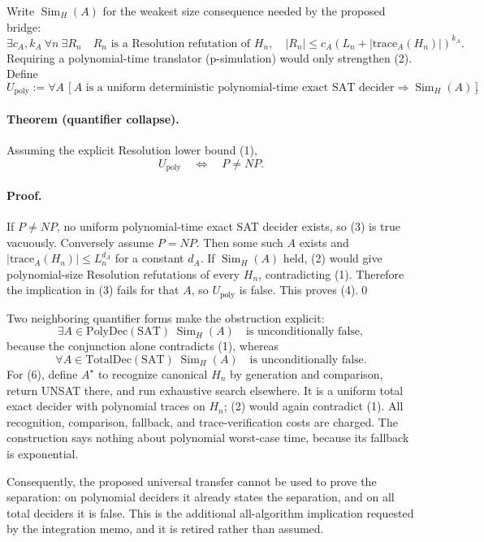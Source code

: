 \documentclass[11pt]{article}
\newcommand{\SAT}{\mathrm{SAT}}
\newcommand{\poly}{\mathrm{poly}}
\begin{document}
Write $\operatorname{Sim}_H(A)$ for the weakest size consequence needed by
the proposed bridge:
\[
 \exists c_A,k_A\ \forall n\ \exists R_n\quad
  R_n\text{ is a Resolution refutation of }H_n,
 \quad |R_n|\le c_A(L_n+|\mathrm{trace}_A(H_n)|)^{k_A}.       \tag{2}
\]
Requiring a polynomial-time translator (p-simulation) would only strengthen
(2).  Define
\[
 U_{\poly}:=\forall A\,[A\text{ is a uniform deterministic polynomial-time
 exact SAT decider}\Rightarrow\operatorname{Sim}_H(A)].      \tag{3}
\]

\paragraph{Theorem (quantifier collapse).}
Assuming the explicit Resolution lower bound (1),
\[
                         U_{\poly}\quad\Longleftrightarrow\quad P\ne NP.
                                                                    \tag{4}
\]

\paragraph{Proof.}
If $P\ne NP$, no uniform polynomial-time exact SAT decider exists, so (3) is
true vacuously.  Conversely assume $P=NP$.  Then some such $A$ exists and
$|\mathrm{trace}_A(H_n)|\le L_n^{d_A}$ for a constant $d_A$.  If
$\operatorname{Sim}_H(A)$ held, (2) would give polynomial-size Resolution
refutations of every $H_n$, contradicting (1).  Therefore the implication in
(3) fails for that $A$, so $U_{\poly}$ is false.  This proves (4).\qed

Two neighboring quantifier forms make the obstruction explicit:
\[
 \exists A\in\mathrm{PolyDec}(\SAT)\;\operatorname{Sim}_H(A)
 \quad\text{is unconditionally false},                         \tag{5}
\]
because the conjunction alone contradicts (1), whereas
\[
 \forall A\in\mathrm{TotalDec}(\SAT)\;\operatorname{Sim}_H(A)
 \quad\text{is unconditionally false}.                         \tag{6}
\]
For (6), define $A^\star$ to recognize canonical $H_n$ by generation and
comparison, return UNSAT there, and run exhaustive search elsewhere.  It is a
uniform total exact decider with polynomial traces on $H_n$; (2) would again
contradict (1).  All recognition, comparison, fallback, and trace-verification
costs are charged.  The construction says nothing about polynomial worst-case
time, because its fallback is exponential.

Consequently, the proposed universal transfer cannot be used to prove the
separation: on polynomial deciders it already states the separation, and on
all total deciders it is false.  This is the additional all-algorithm
implication requested by the integration memo, and it is retired rather than
assumed.
\end{document}
